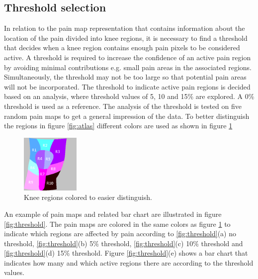 \subsection{Threshold selection}\label{sec:Selectthreshold}
In relation to the pain map representation that contains information about the location of the pain divided into knee regions, it is necessary to find a threshold that decides when a knee region contains enough pain pixels to be considered active. A threshold is required to increase the confidence of an active pain region by avoiding minimal contributions e.g. small pain areas in the associated regions. Simultaneously, the threshold may not be too large so that potential pain areas will not be incorporated. The threshold to indicate active pain regions is decided based on an analysis, where threshold values of 5, 10 and 15\% are explored. A 0\% threshold is used as a reference. 
The analysis of the threshold is tested on five random pain maps to get a general impression of the data. To better distinguish the regions in figure \ref{fig:atlas} different colors are used as shown in figure \ref{fig:colorregion}


\begin{figure} [H]
\centering
\includegraphics[width=0.25\textwidth]{figures/colorregion}
\caption{Knee regions colored to easier distinguish.}
\label{fig:colorregion}
\end{figure}

\noindent
An example of pain maps and related bar chart are illustrated in figure \ref{fig:threshold}. The pain maps are colored in the same colors as figure \ref{fig:colorregion} to indicate which regions are affected by pain according to \ref{fig:threshold}(a) no threshold, \ref{fig:threshold}(b) 5\% threshold, \ref{fig:threshold}(c) 10\% threshold and \ref{fig:threshold}(d) 15\% threshold. 
Figure \ref{fig:threshold}(e) shows a bar chart that indicates how many and which active regions there are according to the threshold values.

